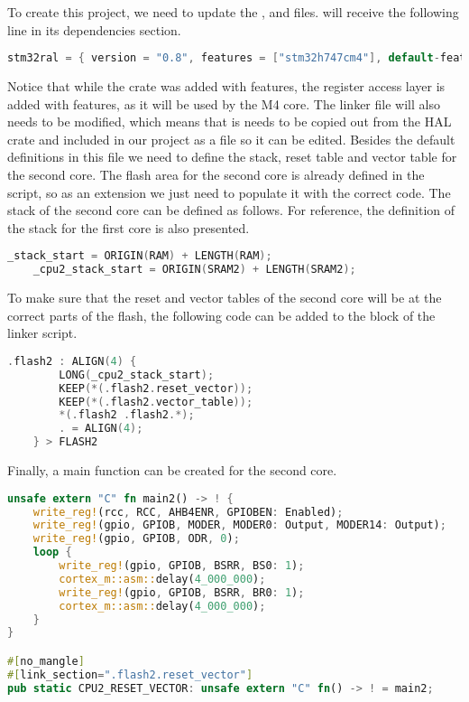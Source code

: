 To create this project, we need to update the ,  and  files.  will receive the following line in its dependencies section.

\begin{lstlisting}[language=C,frame=single,float=!ht,label={lst:stm32-ral},caption={STM32 RAL in Cargo.toml}]
    stm32ral = { version = "0.8", features = ["stm32h747cm4"], default-features = false }
\end{lstlisting}

Notice that while the  crate was added with  features, the register access layer is added with  features, as it will be used by the M4 core. The linker file will also needs to be modified, which means that is needs to be copied out from the HAL crate and included in our project as a file so it can be edited. Besides the default definitions in this file we need to define the stack, reset table and vector table for the second core. The flash area for the second core is already defined in the script, so as an extension we just need to populate it with the correct code. The stack of the second core can be defined as follows. For reference, the definition of the stack for the first core is also presented.

\begin{lstlisting}[language=C,frame=single,float=!ht,label={lst:link-starts},caption={Stack Definitions in Linker File}]
    _stack_start = ORIGIN(RAM) + LENGTH(RAM);
    _cpu2_stack_start = ORIGIN(SRAM2) + LENGTH(SRAM2);
\end{lstlisting}

To make sure that the reset and vector tables of the second core will be at the correct parts of the flash, the following code can be added to the  block of the linker script.

\begin{lstlisting}[language=C,frame=single,float=!ht,label={lst:link-flash2},caption={Flash Definition of Second Core in Linker File}]
    .flash2 : ALIGN(4) {
        LONG(_cpu2_stack_start);
        KEEP(*(.flash2.reset_vector));
        KEEP(*(.flash2.vector_table));
        *(.flash2 .flash2.*);
        . = ALIGN(4);
    } > FLASH2
\end{lstlisting}

Finally, a main function can be created for the second core.

\begin{lstlisting}[language=Rust,frame=single,float=!ht,style=customrust,label={lst:embedded-main2},caption={Main Function of Second Core}]
    unsafe extern "C" fn main2() -> ! {
    write_reg!(rcc, RCC, AHB4ENR, GPIOBEN: Enabled);
    write_reg!(gpio, GPIOB, MODER, MODER0: Output, MODER14: Output);
    write_reg!(gpio, GPIOB, ODR, 0);
    loop {
        write_reg!(gpio, GPIOB, BSRR, BS0: 1);
        cortex_m::asm::delay(4_000_000);
        write_reg!(gpio, GPIOB, BSRR, BR0: 1);
        cortex_m::asm::delay(4_000_000);
    }
}

#[no_mangle]
#[link_section=".flash2.reset_vector"]
pub static CPU2_RESET_VECTOR: unsafe extern "C" fn() -> ! = main2;
\end{lstlisting}

